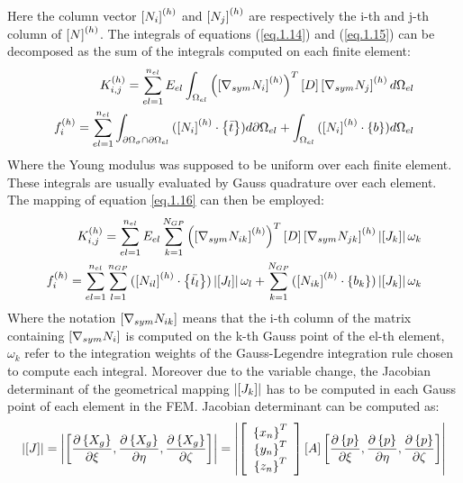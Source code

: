 Here the column vector $\left[{N_i}\right]^{(h)}$ and $\left[{N_j}\right]^{(h)}$ are respectively the i-th and j-th column of $\left[{N}\right]^{(h)}$.
The integrals of equations (\ref{eq.1.14}) and (\ref{eq.1.15}) can be decomposed as the sum of the integrals computed on each finite element: 
\begin{eqnarray}
{K}_{i,j}^{(h)}=\sum_{el=1}^{n_{el}}E_{el}\int_{\Omega_{el}}{\left(\left[{\nabla_{sym}N_i}\right]^{(h)}\right)^T \left[{D}\right]\left[{\nabla_{sym}N_j}\right]^{(h)}   d\Omega_{el}}\\
{f}_{i}^{(h)}=\sum_{el=1}^{n_{el}}\int_{\partial \Omega_{\sigma}\cap\partial \Omega_{el} }{(\left[{N_i}\right]^{(h)} \cdot \left\lbrace{\bar{t}}\right \rbrace )d\partial \Omega_{el}}+\int_{\Omega_{el}}{(\left[{N_i}\right]^{(h)}\cdot \left\lbrace{b}\right \rbrace) d\Omega_{el}}
\end{eqnarray}
Where the Young modulus was supposed to be uniform over each finite element.
 These integrals are usually evaluated by Gauss quadrature over each element.
The mapping of equation \ref{eq.1.16} can then be employed:
 \begin{eqnarray}
 {K}_{i,j}^{(h)}=\sum_{el=1}^{n_{el}}E_{el}\sum_{k=1}^{N_{GP}}{\left(\left[{\nabla_{sym}N_{ik}}\right]^{(h)}\right)^T \left[{D}\right]\left[{\nabla_{sym}N_{jk}}\right]^{(h)}\left|{\left[{J_k}\right]}\right|\omega_k}\\
 {f}_{i}^{(h)}=\sum_{el=1}^{n_{el}}\sum_{l=1}^{n_{GP}} {(\left[{N_{il}}\right]^{(h)} \cdot \left\lbrace{\bar{t_l}}\right \rbrace )\left|{\left[{J_l}\right]}\right|\omega_l}+\sum_{k=1}^{N_{GP}}{(\left[{N_{ik}}\right]^{(h)}\cdot \left\lbrace{b_k}\right \rbrace) \left|{\left[{J_k}\right]}\right|\omega_k}
 \end{eqnarray}
Where the notation $\left[{\nabla_{sym}N_{ik}}\right]$ means that the i-th column of the matrix containing $\left[{\nabla_{sym}N_{i}}\right]$ is computed on the k-th Gauss point of the el-th element, $\omega_k$ refer to the integration weights of the Gauss-Legendre integration rule chosen to compute each integral. Moreover due to the variable change, the Jacobian determinant of the geometrical mapping $\left|{\left[{J_k}\right]}\right|$ has to be computed in each Gauss point of each element in the FEM.
Jacobian determinant can be computed as:
\begin{equation}
\left|{\left[{J}\right]}\right| =\left|{\left[{\frac{\partial \left\lbrace{X_g}\right \rbrace}{\partial \xi},\frac{\partial \left\lbrace{X_g}\right \rbrace}{\partial \eta},\frac{\partial \left\lbrace{X_g}\right \rbrace}{\partial \zeta}}\right]}\right|=\left|{\left[{\begin{array}{c}\left\lbrace{x_n}\right \rbrace^T\\\left\lbrace{y_n}\right \rbrace^T\\\left\lbrace{z_n}\right \rbrace^T\end{array}}\right] \left[{A}\right]\left[{\frac{\partial \left\lbrace{p}\right \rbrace}{\partial \xi},\frac{\partial \left\lbrace{p}\right \rbrace}{\partial \eta},\frac{\partial \left\lbrace{p}\right \rbrace}{\partial \zeta}}\right]}\right| 
\end{equation}
